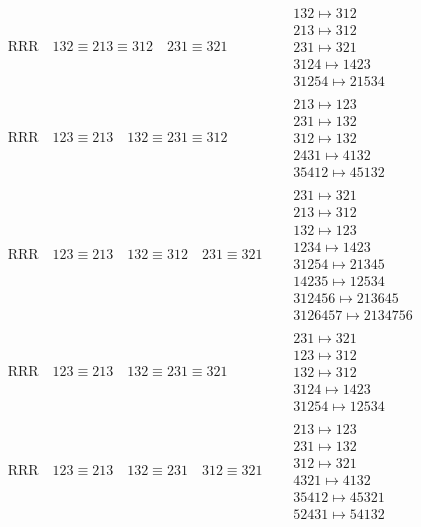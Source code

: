 \documentclass{article}
\begin{document}
\begin{align}
\\
\text{RRR}
\quad
132\equiv213\equiv312
\quad
231\equiv321
\quad
&
\begin{matrix}
132 \mapsto 312
\\
213 \mapsto 312
\\
231 \mapsto 321
\\
3124 \mapsto 1423
\\
31254 \mapsto 21534
\end{matrix}
\\
\text{RRR}
\quad
123\equiv213
\quad
132\equiv231\equiv312
\quad
&
\begin{matrix}
213 \mapsto 123
\\
231 \mapsto 132
\\
312 \mapsto 132
\\
2431 \mapsto 4132
\\
35412 \mapsto 45132
\end{matrix}
\\
\text{RRR}
\quad
123\equiv213
\quad
132\equiv312
\quad
231\equiv321
\quad
&
\begin{matrix}
231 \mapsto 321
\\
213 \mapsto 312
\\
132 \mapsto 123
\\
1234 \mapsto 1423
\\
31254 \mapsto 21345
\\
14235 \mapsto 12534
\\
312456 \mapsto 213645
\\
3126457 \mapsto 2134756
\end{matrix}
\\
\text{RRR}
\quad
123\equiv213
\quad
132\equiv231\equiv321
\quad
&
\begin{matrix}
231 \mapsto 321
\\
123 \mapsto 312
\\
132 \mapsto 312
\\
3124 \mapsto 1423
\\
31254 \mapsto 12534
\end{matrix}
\\
\text{RRR}
\quad
123\equiv213
\quad
132\equiv231
\quad
312\equiv321
\quad
&
\begin{matrix}
213 \mapsto 123
\\
231 \mapsto 132
\\
312 \mapsto 321
\\
4321 \mapsto 4132
\\
35412 \mapsto 45321
\\
52431 \mapsto 54132

\end{matrix}
\end{align}
\end{document}
